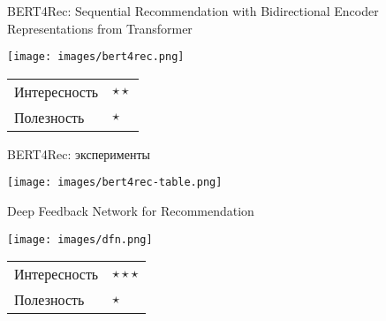 \documentclass[11pt,aspectratio=169,handout]{beamer}
\begin{document}
\begin{frame}{BERT4Rec: Sequential Recommendation with Bidirectional Encoder Representations from Transformer \cite{BERT4Rec}}

\begin{center}
\texttt{[image: images/bert4rec.png]}
\end{center}

\begin{tabular}{l l}
Интересность & $\star\star$ \\
Полезность & $\star$
\end{tabular}

\end{frame}

\begin{frame}{BERT4Rec: эксперименты}

\begin{center}
\texttt{[image: images/bert4rec-table.png]}
\end{center}

\end{frame}

\begin{frame}{Deep Feedback Network for Recommendation \cite{DFN}}

\begin{center}
\texttt{[image: images/dfn.png]}
\end{center}

\begin{tabular}{l l}
Интересность & $\star\star\star$ \\
Полезность & $\star$
\end{tabular}

\end{frame}
\end{document}

